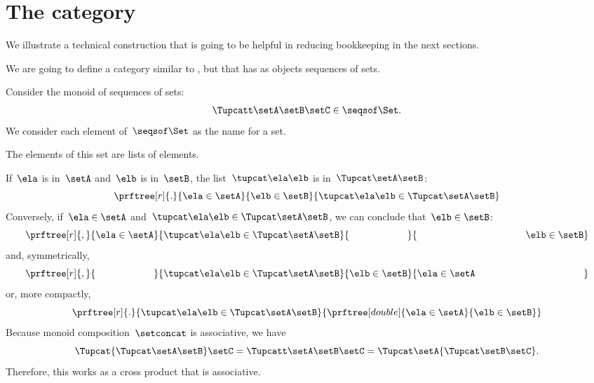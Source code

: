 \section{The \SetStar category}
\label{sec:SetStar}

We illustrate a technical construction that is going to be helpful in reducing bookkeeping in the next sections.

We are going to define a category similar to \Set, but that has as objects sequences of sets.

Consider the monoid of sequences of sets:
%
\begin{equation}
    \label{eq:sets-monoid}
    \Tupcatt \setA  \setB  \setC \in \seqsof\Set.
\end{equation}
%
We consider each element of~$\seqsof\Set$ as the name for a set.

The elements of this set are lists of elements.

If~$\ela$ is in~$\setA$ and~$\elb$ is in~$\setB$, the list~$\tupcat \ela \elb$ is in~$\Tupcat \setA \setB$:
%
\begin{equation}
    \label{eq:sets-monoid-axiom1}
    \prftree[r]{.}{
        \ela \in \setA
    }{
        \elb \in \setB
    }{
        \tupcat \ela \elb \in \Tupcat \setA \setB
    }
\end{equation}
%
Conversely, if~$\ela \in \setA$ and~$\tupcat \ela \elb \in \Tupcat \setA \setB$, we can conclude that~$\elb \in \setB$:
%
\begin{equation}
    \label{eq:sets-monoid-axiom2}
    \prftree[r]{,}{
        \ela \in \setA
    }{
        \tupcat \ela \elb \in \Tupcat \setA  \setB
    }{
        \phantom{\elb \in \setB}
    }{
        \rule{39mm}{0pt} \elb \in  \setB
    }
\end{equation}
%
and, symmetrically,
%
\begin{equation}
    \label{eq:sets-monoid-axiom3}
    \prftree[r]{,}{
        \phantom{\ela \in \setA}
    }{
        \tupcat \ela \elb \in \Tupcat \setA \setB
    }{
        \elb \in \setB
    }{
        \ela \in  \setA \rule{39mm}{0pt}
    }
\end{equation}
%
or, more compactly,
%
\begin{equation}
    \label{eq:sets-monoid-axiom3bis}
    \prftree[r]{.}{
        \tupcat \ela \elb \in \Tupcat \setA \setB
    }{
        \prftree[double]{
            \ela \in \setA
        }{
            \elb \in \setB
        }
    }
\end{equation}
%
Because monoid composition~$\setconcat$ is associative, we have
%
\begin{equation}
    \label{eq:sets-monoid-comp}
    \Tupcat {\Tupcat \setA  \setB}  \setC  =
    \Tupcatt \setA    \setB \setC  =
    \Tupcat   \setA  {\Tupcat \setB  \setC}.
\end{equation}
%
Therefore, this works as a cross product that is associative.

